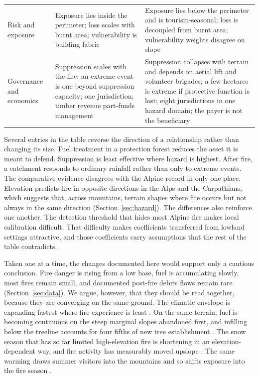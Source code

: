 \documentclass[11pt,a4paper]{article}
\begin{document}
\begin{table}[H]
\begin{tabularx}{\textwidth}{@{}p{2.1cm} X X@{}}
Risk and exposure & Exposure lies inside the perimeter; loss scales with burnt area; vulnerability is building fabric & Exposure lies below the perimeter and is tourism-seasonal; loss is decoupled from burnt area; vulnerability weights disagree on slope \\
Governance and economics & Suppression scales with the fire; an extreme event is one beyond suppression capacity; one jurisdiction; timber revenue part-funds management & Suppression collapses with terrain and depends on aerial lift and volunteer brigades; a few hectares is extreme if protective function is lost; eight jurisdictions in one hazard domain; the payer is not the beneficiary \\
\bottomrule
\end{tabularx}
\end{table}

Several entries in the table reverse the direction of a relationship rather than changing its size. Fuel treatment in a protection forest reduces the asset it is meant to defend. Suppression is least effective where hazard is highest. After fire, a catchment responds to ordinary rainfall rather than only to extreme events. The comparative evidence disagrees with the Alpine record in only one place. Elevation predicts fire in opposite directions in the Alps and the Carpathians, which suggests that, across mountains, terrain shapes where fire occurs but not always in the same direction (Section~\ref{sec:hazard}). The differences also reinforce one another. The detection threshold that hides most Alpine fire makes local calibration difficult. That difficulty makes coefficients transferred from lowland settings attractive, and those coefficients carry assumptions that the rest of the table contradicts.

Taken one at a time, the changes documented here would support only a cautious conclusion. Fire danger is rising from a low base, fuel is accumulating slowly, most fires remain small, and documented post-fire debris flows remain rare (Section~\ref{sec:data}). We argue, however, that they should be read together, because they are converging on the same ground. The climatic envelope is expanding fastest where fire experience is least \citep{gerberding_mapping_2025, miller_climate_2024}. On the same terrain, fuel is becoming continuous on the steep marginal slopes abandoned first, and infilling below the treeline accounts for four fifths of new tree establishment \citep{frei_evidence_2023, garbarino_contrasting_2020, conedera_linking_2024}. The snow season that has so far limited high-elevation fire is shortening in an elevation-dependent way, and fire activity has measurably moved upslope \citep{rangwala_climate_2012, beloiu_climatedriven_2026}. The same warming draws summer visitors into the mountains and so shifts exposure into the fire season \citep{pede_mountain_2022}.
\end{document}
